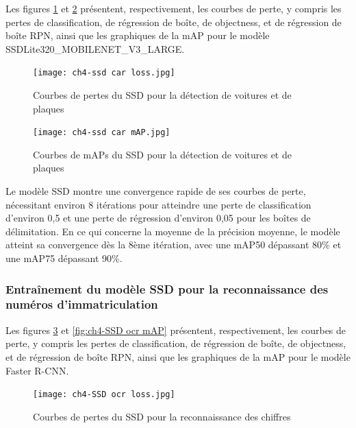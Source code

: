 Les figures \ref{fig:ch4-ssd car loss} et \ref{fig:ch4-ssd car mAP} présentent, respectivement, les courbes de perte, y compris les pertes de classification, de régression de boîte, de objectness, et de régression de boîte RPN, ainsi que les graphiques de la mAP pour le modèle SSDLite320\_MOBILENET\_V3\_LARGE.


\begin{figure}[H]
	\centering
	\texttt{[image: ch4-ssd car loss.jpg]}
	\caption{Courbes de pertes du SSD pour la détection de voitures et de plaques}
\label{fig:ch4-ssd car loss}
\end{figure}


\begin{figure}[H]
	\centering
	\texttt{[image: ch4-ssd car mAP.jpg]}
	\caption{Courbes de mAPs du SSD pour la détection de voitures et de plaques}
\label{fig:ch4-ssd car mAP}
\end{figure}


Le modèle SSD montre une convergence rapide de ses courbes de perte, nécessitant environ 8 itérations pour atteindre une perte de classification d'environ 0,5 et une perte de régression d'environ 0,05 pour les boîtes de délimitation. En ce qui concerne la moyenne de la précision moyenne, le modèle atteint sa convergence dès la 8ème itération, avec une mAP50 dépassant 80\% et une mAP75 dépassant 90\%.

\subsubsection{Entraînement du modèle SSD pour la reconnaissance des numéros d'immatriculation}

Les figures \ref{fig:ch4-SSD ocr loss} et \ref{fig:ch4-SSD ocr mAP} présentent, respectivement, les courbes de perte, y compris les pertes de classification, de régression de boîte, de objectness, et de régression de boîte RPN, ainsi que les graphiques de la mAP pour le modèle Faster R-CNN.


\begin{figure}[H]
	\centering
	\texttt{[image: ch4-SSD ocr loss.jpg]}
	\caption{Courbes de pertes du SSD pour la reconnaissance des chiffres}
\label{fig:ch4-SSD ocr loss}
\end{figure}

